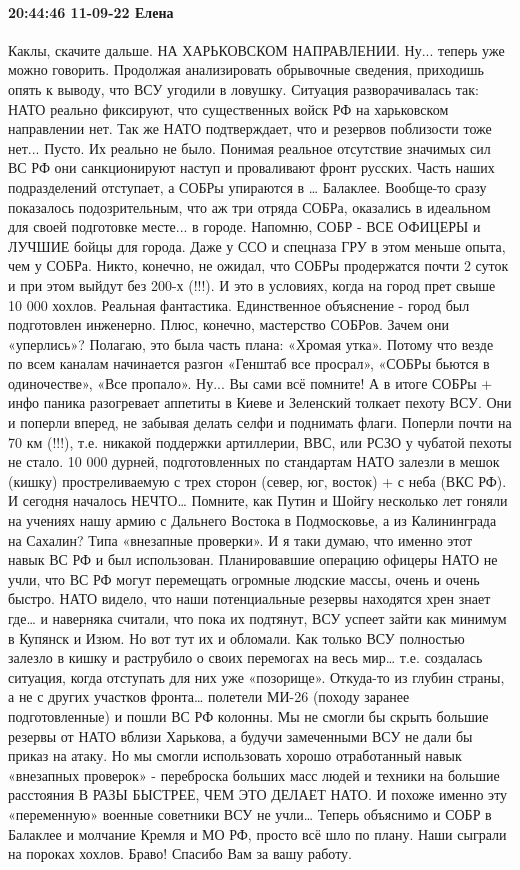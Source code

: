 \paragraph{20:44:46 11-09-22 Елена 🍒🍒🍒🍒}

Каклы, скачите дальше.
НА ХАРЬКОВСКОМ НАПРАВЛЕНИИ. Ну... теперь уже можно говорить.
Продолжая анализировать обрывочные сведения, приходишь опять к выводу, что ВСУ угодили в ловушку. Ситуация разворачивалась так:
НАТО реально фиксируют, что существенных войск РФ на харьковском направлении нет. Так же НАТО подтверждает, что и резервов поблизости тоже нет... Пусто. Их реально не было. Понимая реальное отсутствие значимых сил ВС РФ они санкционируют наступ и проваливают фронт русских.
Часть наших подразделений отступает, а СОБРы упираются в … Балаклее.
Вообще-то сразу показалось подозрительным, что аж три отряда СОБРа, оказались в идеальном для своей подготовке месте... в городе.
Напомню, СОБР - ВСЕ ОФИЦЕРЫ и ЛУЧШИЕ бойцы для города. Даже у ССО и спецназа ГРУ в этом меньше опыта, чем у СОБРа. Никто, конечно, не ожидал, что СОБРы продержатся почти 2 суток и при этом выйдут без 200-х (!!!).
И это в условиях, когда на город прет свыше 10 000 хохлов.
Реальная фантастика. Единственное объяснение - город был подготовлен инженерно. Плюс, конечно, мастерство СОБРов.
Зачем они «уперлись»?
Полагаю, это была часть плана: «Хромая утка».
Потому что везде по всем каналам начинается разгон «Генштаб все просрал», «СОБРы бьются в одиночестве», «Все пропало». Ну... Вы сами всё помните! А в итоге СОБРы + инфо паника разогревает аппетиты в Киеве и Зеленский толкает пехоту ВСУ. Они и поперли вперед, не забывая делать селфи и поднимать флаги. Поперли почти на 70 км (!!!), т.е. никакой поддержки артиллерии, ВВС, или РСЗО у чубатой пехоты не стало. 10 000 дурней, подготовленных по стандартам НАТО залезли в мешок (кишку) простреливаемую с трех сторон (север, юг, восток) + с неба (ВКС РФ). И сегодня началось НЕЧТО…
Помните, как Путин и Шойгу несколько лет гоняли на учениях нашу армию с Дальнего Востока в Подмосковье, а из Калининграда на Сахалин? Типа «внезапные проверки».
И я таки думаю, что именно этот навык ВС РФ и был использован.
Планировавшие операцию офицеры НАТО не учли, что ВС РФ могут перемещать огромные людские массы, очень и очень быстро. НАТО видело, что наши потенциальные резервы находятся хрен знает где… и наверняка считали, что пока их подтянут, ВСУ успеет зайти как минимум в Купянск и Изюм. Но вот тут их и обломали.
Как только ВСУ полностью залезло в кишку и раструбило о своих перемогах на весь мир… т.е. создалась ситуация, когда отступать для них уже «позорище». Откуда-то из глубин страны, а не с других участков фронта… полетели МИ-26 (походу заранее подготовленные) и пошли ВС РФ колонны.
Мы не смогли бы скрыть большие резервы от НАТО вблизи Харькова, а будучи замеченными ВСУ не дали бы приказ на атаку. Но мы смогли использовать хорошо отработанный навык «внезапных проверок» - переброска больших масс людей и техники на большие расстояния В РАЗЫ БЫСТРЕЕ, ЧЕМ ЭТО ДЕЛАЕТ НАТО. И похоже именно эту «переменную» военные советники ВСУ не учли…
Теперь объяснимо и СОБР в Балаклее и молчание Кремля и МО РФ, просто всё шло по плану. Наши сыграли на пороках хохлов. Браво! Спасибо Вам за вашу работу.

